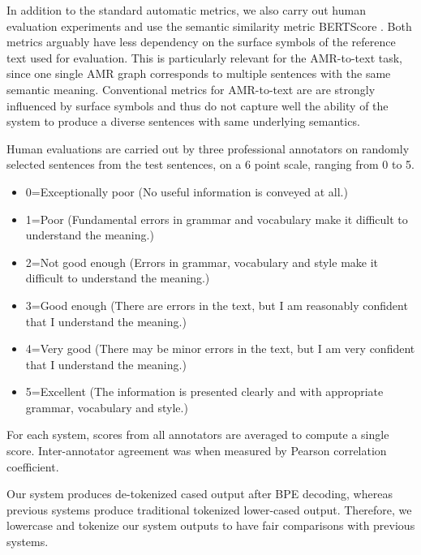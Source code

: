 \documentclass[11pt,a4paper]{article}
\begin{document}
In addition to the standard automatic metrics, we also carry out human evaluation experiments and use the semantic similarity metric BERTScore \cite{bert-score}. Both metrics arguably have less dependency on the surface symbols of the reference text used for evaluation. This is particularly relevant for the AMR-to-text task, since one single AMR graph corresponds to multiple sentences with the same semantic meaning. Conventional metrics for AMR-to-text are are strongly influenced by surface symbols and thus do not capture well the ability of the system to produce a diverse sentences with same underlying semantics.

Human evaluations are carried out by three professional annotators on  randomly selected sentences from the  test sentences, on a 6 point scale, ranging from 0 to 5.
\begin{itemize}
\item {\small 0=Exceptionally poor (No useful information is conveyed at all.)}
\item {\small 1=Poor (Fundamental errors in grammar and vocabulary make it difficult to understand the meaning.)}
\item {\small 2=Not good enough (Errors in grammar, vocabulary and style make it difficult to understand the meaning.)}
\item {\small 3=Good enough (There are errors in the text, but I am reasonably confident that I understand the meaning.)}
\item {\small 4=Very good (There may be minor errors in the text, but I am very confident that I understand the meaning.)}
\item {\small 5=Excellent (The information is presented clearly and with appropriate grammar, vocabulary and style.)}
\end{itemize}
For each system, scores from all annotators are averaged to compute a single score. Inter-annotator agreement was  when measured by Pearson correlation coefficient.




Our system produces de-tokenized cased output after BPE decoding, whereas previous systems produce traditional tokenized lower-cased output. Therefore, we lowercase and tokenize our system outputs to have fair comparisons with previous systems.
\end{document}
